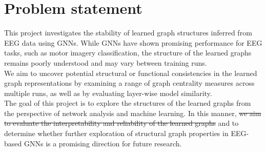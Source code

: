 \section*{Problem statement}
This project investigates the stability of learned graph structures inferred from EEG data using GNNs. While GNNs have shown promising performance for EEG tasks, such as motor imagery classification, the structure of the learned graphs remains poorly understood and may vary between training runs. 
\vspace{0.5em}\\
We aim to uncover potential structural or functional consistencies in the learned graph representations by examining a range of graph centrality measures across multiple runs, as well as by evaluating layer-wise model similarity. 
\vspace{0.5em}\\
The goal of this project is to explore the structures of the learned graphs from the perspective of network analysis and machine learning. In this manner,\sout{ we aim to evaluate the interpretability and reliability of the learned graphs} and to determine whether further exploration of structural graph properties in EEG-based GNNs is a promising direction for future research.
